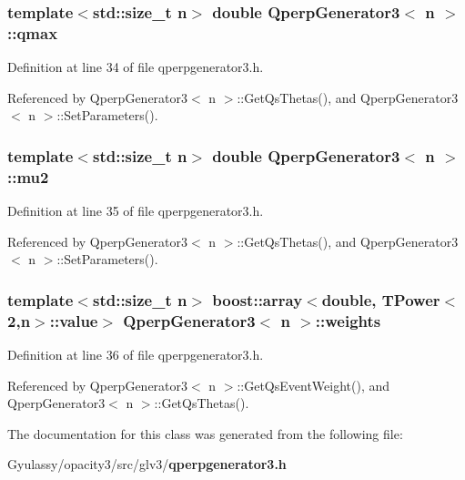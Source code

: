 \subsubsection{\setlength{\rightskip}{0pt plus 5cm}template$<$std::size\_\-t n$>$ double {\bf QperpGenerator3}$<$ n $>$::{\bf qmax}\hspace{0.3cm}{\tt  [private]}}\label{classQperpGenerator3_4a9d6c2d97c851d9d012fda899fb3f86}




Definition at line 34 of file qperpgenerator3.h.

Referenced by QperpGenerator3$<$ n $>$::GetQsThetas(), and QperpGenerator3$<$ n $>$::SetParameters().
\subsubsection{\setlength{\rightskip}{0pt plus 5cm}template$<$std::size\_\-t n$>$ double {\bf QperpGenerator3}$<$ n $>$::{\bf mu2}\hspace{0.3cm}{\tt  [private]}}\label{classQperpGenerator3_f65e5abc92aea7d7b221160bb04953d7}




Definition at line 35 of file qperpgenerator3.h.

Referenced by QperpGenerator3$<$ n $>$::GetQsThetas(), and QperpGenerator3$<$ n $>$::SetParameters().
\subsubsection{\setlength{\rightskip}{0pt plus 5cm}template$<$std::size\_\-t n$>$ boost::array$<$double, {\bf TPower}$<$2,n$>$::value$>$ {\bf QperpGenerator3}$<$ n $>$::{\bf weights}\hspace{0.3cm}{\tt  [private]}}\label{classQperpGenerator3_c915b1095818e4b5d05e890eb02b37e2}




Definition at line 36 of file qperpgenerator3.h.

Referenced by QperpGenerator3$<$ n $>$::GetQsEventWeight(), and QperpGenerator3$<$ n $>$::GetQsThetas().

The documentation for this class was generated from the following file:\begin{CompactItemize}
\item 
Gyulassy/opacity3/src/glv3/{\bf qperpgenerator3.h}\end{CompactItemize}
